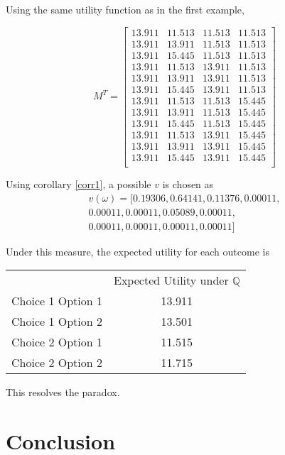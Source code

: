 \documentclass{article}
\begin{document}
Using the same utility function as in the first example,

\[M^T=\begin{bmatrix}
	13.911 & 11.513 & 11.513 & 11.513  \\
	13.911 & 13.911  & 11.513 & 11.513 \\
	13.911 & 15.445 & 11.513 & 11.513 \\
	13.911 & 11.513 & 13.911 & 11.513 \\
	13.911 & 13.911  & 13.911 & 11.513 \\
	13.911 & 15.445  & 13.911 & 11.513 \\
	13.911 & 11.513 & 11.513  & 15.445 \\
	13.911 & 13.911  & 11.513  & 15.445 \\
	13.911 & 15.445  & 11.513  & 15.445 \\
	13.911 & 11.513  & 13.911  & 15.445 \\
	13.911 & 13.911  & 13.911  & 15.445 \\
	13.911 & 15.445  & 13.911  & 15.445 \\
\end{bmatrix}\]


Using corollary \ref{corr1}, a possible \(v\) is chosen as 
\begin{equation*}
\begin{aligned}
v(\omega)=[0.19306, 0.64141, 0.11376, 0.00011, \\ 
0.00011, 0.00011, 0.05089, 0.00011, \\
0.00011, 0.00011, 0.00011, 0.00011]
\end{aligned}
\end{equation*}

Under this measure, the expected utility for each outcome is 

\begin{center} 
	\begin{tabular}{c c}
		& Expected Utility under \(\mathbb{Q}\) \\
		Choice 1 Option 1 & 13.911 \\
		Choice 1 Option 2 & 13.501 \\
		Choice 2 Option 1 & 11.515 \\
		Choice 2 Option 2 & 11.715 \\
	\end{tabular}
\end{center}

This resolves the paradox.  

\section{Conclusion}
\end{document}
